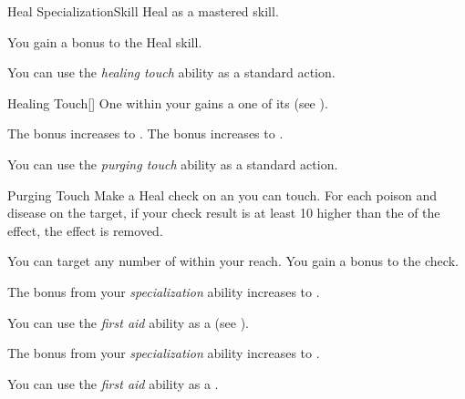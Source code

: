     \begin{feat}{Heal Specialization}{Skill}
        \featpre Heal as a mastered skill.

         You gain a  bonus to the Heal skill.

         You can use the \textit{healing touch} ability as a standard action.
        \begin{freeability}{Healing Touch}[]
            One  within your  gains a   one of its  (see ).

            \rankline
             The bonus increases to .
             The bonus increases to .
        \end{freeability}

         You can use the \textit{purging touch} ability as a standard action.
        \begin{freeability}{Purging Touch}
            Make a Heal check on an  you can touch.
            For each poison and disease on the target, if your check result is at least 10 higher than the  of the effect, the effect is removed.

            \rankline
             You can target any number of  within your reach.
             You gain a  bonus to the check.
        \end{freeability}

         The bonus from your \textit{specialization} ability increases to .

         You can use the \textit{first aid} ability as a  (see ).

         The bonus from your \textit{specialization} ability increases to .

         You can use the \textit{first aid} ability as a .
    \end{feat}

